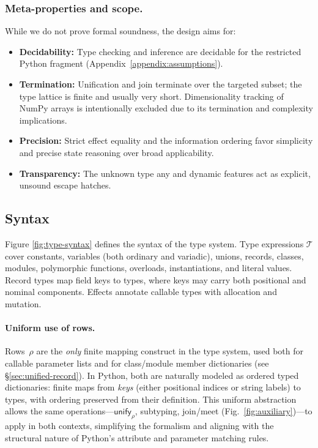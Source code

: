 \subsubsection*{Meta-properties and scope.}
While we do not prove formal soundness, the design aims for:
\begin{itemize}
  \item \textbf{Decidability:} Type checking and inference are decidable for the restricted Python fragment (Appendix~\ref{appendix:assumptions}).
  \item \textbf{Termination:} Unification and join terminate over the targeted subset; the type lattice is finite and usually very short. Dimensionality tracking of NumPy arrays is intentionally excluded due to its termination and complexity implications.
  \item \textbf{Precision:} Strict effect equality and the information ordering favor simplicity and precise state reasoning over broad applicability.
  \item \textbf{Transparency:} The unknown type \textsf{any} and dynamic features act as explicit, unsound escape hatches.
\end{itemize}

\subsection{Syntax}
Figure \ref{fig:type-syntax} defines the syntax of the type system. Type expressions $\mathcal{T}$ cover constants, variables (both ordinary and variadic), unions, records, classes, modules, polymorphic functions, overloads, instantiations, and literal values.  
Record types map field keys to types, where keys may carry both positional and nominal components.  
Effects annotate callable types with allocation and mutation.

\paragraph{Uniform use of rows.}
Rows~$\rho$ are the \emph{only} finite mapping construct in the type system, used both for
callable parameter lists and for class/module member dictionaries (see §\ref{sec:unified-record}).  
In Python, both are naturally modeled as ordered typed dictionaries: finite maps from
\emph{keys} (either positional indices or string labels) to types, with ordering
preserved from their definition.  
This uniform abstraction allows the same operations—$\mathsf{unify}_{\rho}$, subtyping, join/meet (Fig.~\ref{fig:auxiliary})—to apply in both contexts,  
simplifying the formalism and aligning with the structural nature of Python's
attribute and parameter matching rules.

